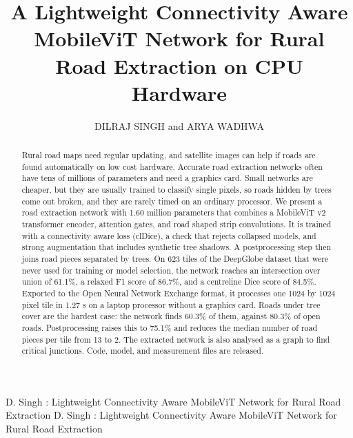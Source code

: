 \documentclass{ieeeaccess}
\begin{document}

\title{A Lightweight Connectivity Aware MobileViT Network for Rural Road Extraction on CPU Hardware}

\author{\uppercase{Dilraj Singh} and
\uppercase{Arya Wadhwa}}

\address[1]{Department of Computer Science and Engineering (Artificial Intelligence and Machine Learning), R. V. College of Engineering, Bengaluru 560059, India (e-mail: dilrajsingh.ai24@rvce.edu.in; aryawadhwa.ai24@rvce.edu.in)}


\markboth
{D. Singh \headeretal: Lightweight Connectivity Aware MobileViT Network for Rural Road Extraction}
{D. Singh \headeretal: Lightweight Connectivity Aware MobileViT Network for Rural Road Extraction}


\begin{abstract}
Rural road maps need regular updating, and satellite images can help if roads are found automatically on low cost hardware. Accurate road extraction networks often have tens of millions of parameters and need a graphics card. Small networks are cheaper, but they are usually trained to classify single pixels, so roads hidden by trees come out broken, and they are rarely timed on an ordinary processor. We present a road extraction network with 1.60 million parameters that combines a MobileViT v2 transformer encoder, attention gates, and road shaped strip convolutions. It is trained with a connectivity aware loss (clDice), a check that rejects collapsed models, and strong augmentation that includes synthetic tree shadows. A postprocessing step then joins road pieces separated by trees. On 623 tiles of the DeepGlobe dataset that were never used for training or model selection, the network reaches an intersection over union of 61.1\%, a relaxed F1 score of 86.7\%, and a centreline Dice score of 84.5\%. Exported to the Open Neural Network Exchange format, it processes one 1024 by 1024 pixel tile in 1.27 s on a laptop processor without a graphics card. Roads under tree cover are the hardest case: the network finds 60.3\% of them, against 80.3\% of open roads. Postprocessing raises this to 75.1\% and reduces the median number of road pieces per tile from 13 to 2. The extracted network is also analysed as a graph to find critical junctions. Code, model, and measurement files are released.
\end{abstract}
\end{document}
